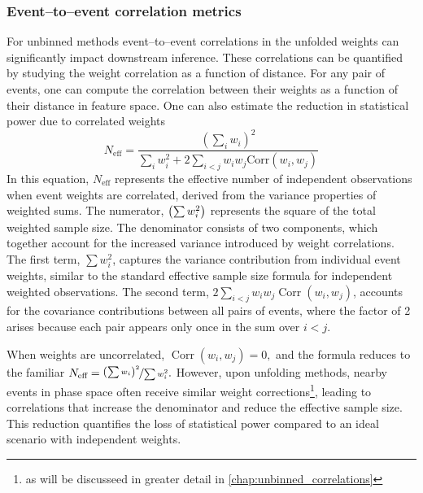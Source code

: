         \subsubsection{Event--to--event correlation metrics}
            For unbinned methods event--to--event correlations in the unfolded weights can significantly impact downstream inference.
            These correlations can be quantified by studying the weight correlation as a function of distance.
            For any pair of events, one can compute the correlation between their weights as a function of their distance in feature space.
            One can also estimate the reduction in statistical power due to correlated weights
            \begin{equation}
                \label{eq:n-eff}
                N_{\text{eff}} = \frac{\left(\sum_{i} w_i\right)^2}{\sum_{i} w_i^2 + 2\sum_{i<j} w_i w_j \text{Corr}(w_i, w_j)}
            \end{equation}
            In this equation, \(N_{\text{eff}}\) represents the effective number of independent observations when event weights are correlated, derived from the variance properties of weighted sums.
            The numerator, \(\qty(\sum w_i^2)\) represents the square of the total weighted sample size.
            The denominator consists of two components, which together account for the increased variance introduced by weight correlations.
            The first term, \(\sum w_i^2\), captures the variance contribution from individual event weights, similar to the standard effective sample size formula for independent weighted observations.
            The second term, \(2\sum_{i<j} w_i w_j \operatorname{Corr}(w_i, w_j)\), accounts for the covariance contributions between all pairs of events, where the factor of 2 arises because each pair appears only once in the sum over \(i<j\).

            When weights are uncorrelated, \(\operatorname{Corr}(w_i, w_j) = 0,\) and the formula reduces to the familiar \(N_{\text{eff}}=\nicefrac{\qty(\sum w_i)^2}{\sum w_i^2}.\)
            However, upon unfolding methods, nearby events in phase space often receive similar weight corrections\footnote{as will be discusseed in greater detail in \cref{chap:unbinned_correlations}}, leading to correlations that increase the denominator and reduce the effective sample size.
            This reduction quantifies the loss of statistical power compared to an ideal scenario with independent weights.

